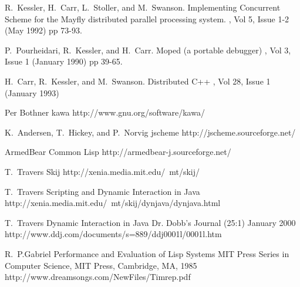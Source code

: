 \documentclass{acm-final/sig-alternate-modified}
\begin{document}
\begin{thebibliography}{1}

 R.~Kessler, H.~Carr, L.~Stoller, and M.~Swanson.
\newblock Implementing Concurrent Scheme for the Mayfly distributed
parallel processing system.  , Vol 5, Issue 1-2 (May 1992) pp 73-93.

P.~Pourheidari, R.~Kessler, and H.~Carr.
\newblock Moped (a portable debugger)
, Vol 3, Issue 1 (January 1990) pp 39-65.

H.~Carr, R.~Kessler, and M.~Swanson.
\newblock Distributed C++
, Vol 28, Issue 1 (January 1993)

Per Bothner
\newblock kawa
\newblock http://www.gnu.org/software/kawa/

K.~Andersen, T.~Hickey, and P.~Norvig
\newblock jscheme
\newblock http://jscheme.sourceforge.net/

\newblock ArmedBear Common Lisp
\newblock http://armedbear-j.sourceforge.net/

T.~Travers
\newblock Skij
\newblock http://xenia.media.mit.edu/~mt/skij/

T.~Travers
\newblock Scripting and Dynamic Interaction in Java
\newblock http://xenia.media.mit.edu/~mt/skij/dynjava/dynjava.html

T.~Travers
\newblock Dynamic Interaction in Java
\newblock Dr. Dobb's Journal (25:1) January 2000
\newblock http://www.ddj.com/documents/s=889/ddj0001l/0001l.htm

R.~P.Gabriel
\newblock Performance and Evaluation of Lisp Systems
\newblock MIT Press Series in Computer Science, MIT Press, Cambridge, MA, 1985
\newblock http://www.dreamsongs.com/NewFiles/Timrep.pdf

\end{thebibliography}
\end{document}
